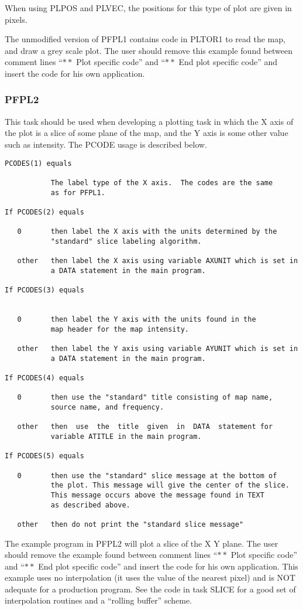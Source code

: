 When using PLPOS and PLVEC, the positions for this type of plot are
given in pixels.

The unmodified version of PFPL1 contains code in PLTOR1 to read the
map, and draw a grey scale plot.  The user should remove this example
found between comment lines ``$\ast\ast$ Plot specific code'' and
``$\ast\ast$ End plot specific code'' and insert the code for his
own application.

\subsubsection{PFPL2}
This task should be used when developing a plotting task in which the
X axis of the plot is a slice of some plane of the map, and the Y axis
is some other value such as intensity.  The PCODE usage is described
below.

\begin{verbatim}
PCODES(1) equals

           The label type of the X axis.  The codes are the same
           as for PFPL1.

If PCODES(2) equals

   0       then label the X axis with the units determined by the
           "standard" slice labeling algorithm.

   other   then label the X axis using variable AXUNIT which is set in
           a DATA statement in the main program.

If PCODES(3) equals


   0       then label the Y axis with the units found in the
           map header for the map intensity.

   other   then label the Y axis using variable AYUNIT which is set in
           a DATA statement in the main program.

If PCODES(4) equals

   0       then use the "standard" title consisting of map name,
           source name, and frequency.

   other   then  use  the  title  given  in  DATA  statement for
           variable ATITLE in the main program.

If PCODES(5) equals

   0       then use the "standard" slice message at the bottom of
           the plot. This message will give the center of the slice.
           This message occurs above the message found in TEXT
           as described above.

   other   then do not print the "standard slice message"

\end{verbatim}
The example program in PFPL2 will plot a slice of the X Y plane. The
user should remove the example found between comment lines ``$\ast\ast$ Plot
specific code'' and ``$\ast\ast$ End plot specific code'' and insert the code
for his own application. This example uses no interpolation (it uses
the value of the nearest pixel) and is NOT adequate for a production
program.  See the code in task SLICE for a good set of interpolation
routines and a ``rolling buffer'' scheme.

